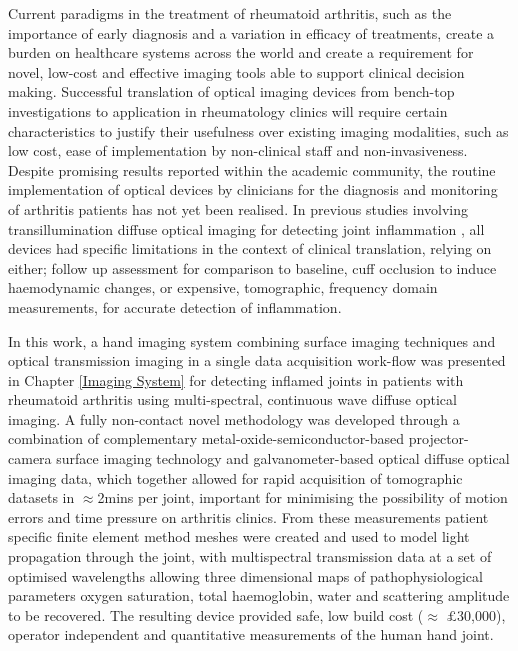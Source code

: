\documentclass[twoside]{bhamthesis}
\theoremstyle{definition}
\begin{document}
Current paradigms in the treatment of rheumatoid arthritis, such as the importance of early diagnosis and a variation in efficacy of treatments, create a burden on healthcare systems across the world and create a requirement for novel, low-cost and effective imaging tools able to support clinical decision making. Successful translation of optical imaging devices from bench-top investigations to application in rheumatology clinics will require certain characteristics to justify their usefulness over existing imaging modalities, such as low cost, ease of implementation by non-clinical staff and non-invasiveness. Despite promising results reported within the academic community, the routine implementation of optical devices by clinicians for the diagnosis and monitoring of arthritis patients has not yet been realised. In previous studies involving transillumination diffuse optical imaging for detecting joint inflammation \cite{van2016assessment,hielscher2004sagittal,beuthan2002light,prapavat1995evaluation,prapavat1998evaluation,scheel2003laser}, all devices had specific limitations in the context of clinical translation, relying on either; follow up assessment for comparison to baseline, cuff occlusion to induce haemodynamic changes, or expensive, tomographic, frequency domain measurements, for accurate detection of inflammation.

In this work, a hand imaging system combining surface imaging techniques and optical transmission imaging in a single data acquisition work-flow was presented in Chapter \ref{Imaging System} for detecting inflamed joints in patients with rheumatoid arthritis using multi-spectral, continuous wave diffuse optical imaging. A fully non-contact novel methodology was developed through a combination of complementary metal-oxide-semiconductor-based projector-camera surface imaging technology and galvanometer-based optical diffuse optical imaging data, which together allowed for rapid acquisition of tomographic datasets in $\approx$2mins per joint, important for minimising the possibility of motion errors and time pressure on arthritis clinics. From these measurements patient specific finite element method meshes were created and used to model light propagation through the joint, with multispectral transmission data at a set of optimised wavelengths allowing three dimensional maps of pathophysiological parameters oxygen saturation, total haemoglobin, water and scattering amplitude to be recovered. The resulting device provided safe, low build cost ($\approx$ $\pounds$30,000), operator independent and quantitative measurements of the human hand joint.
\end{document}

